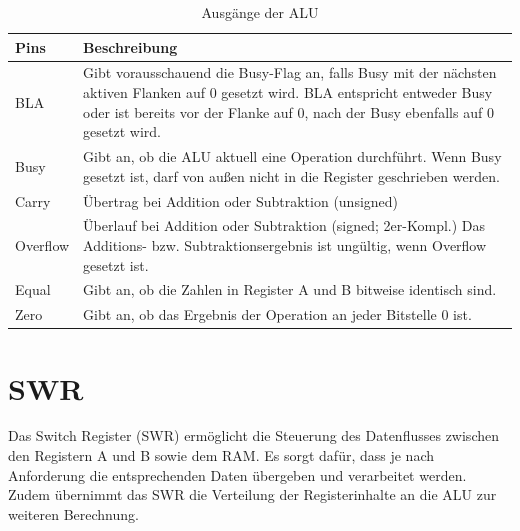 \begin{table}[H]
  \centering
  \begin{tabular}{|l|p{11cm}|}
    \hline
    \textbf{Pins} & \textbf{Beschreibung}                                               \\
    \hline
    BLA           &
    Gibt vorausschauend die Busy-Flag an, falls Busy mit der nächsten aktiven Flanken
    auf 0 gesetzt wird. BLA entspricht entweder Busy oder ist bereits vor der Flanke auf 0,
    nach der Busy ebenfalls auf 0 gesetzt wird.                                         \\
    \hline
    Busy          & Gibt an, ob die ALU aktuell eine Operation durchführt.
    Wenn Busy gesetzt ist, darf von außen nicht in die Register geschrieben werden.     \\
    \hline
    Carry         & Übertrag bei Addition oder Subtraktion (unsigned)                   \\
    \hline
    Overflow      & Überlauf bei Addition oder Subtraktion (signed; 2er-Kompl.)
    Das Additions- bzw. Subtraktionsergebnis ist ungültig, wenn Overflow gesetzt ist.   \\
    \hline
    Equal         & Gibt an, ob die Zahlen in Register A und B bitweise identisch sind. \\
    \hline
    Zero          & Gibt an, ob das Ergebnis der Operation an jeder Bitstelle 0 ist.    \\
    \hline
  \end{tabular}
  \caption{Ausgänge der ALU}
  \label{fig:Ausgänge der ALU}
\end{table}







\section{SWR}
\label{sec:SWR}
Das Switch Register (SWR) ermöglicht die Steuerung des Datenflusses zwischen den Registern A und B sowie
dem RAM. Es sorgt dafür, dass je nach Anforderung die entsprechenden Daten übergeben und verarbeitet werden.
Zudem übernimmt das SWR die Verteilung der Registerinhalte an die ALU zur weiteren Berechnung.

